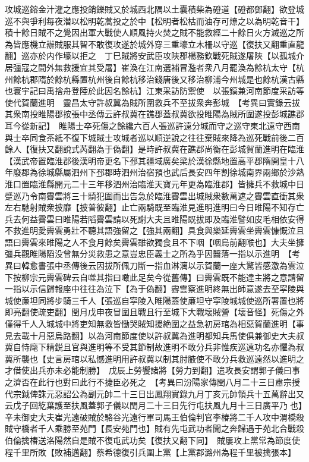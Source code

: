 攻城巡鎔金汁灌之應投銷鑠賊又於城西北隅以土囊積柴為磴道【磴都鄧翻】欲登城巡不與爭利每夜潜以松明乾蒿投之於中【松明者松枯而油存可燎之以為明乾音干】積十餘日賊不之覺因出軍大戰使人順風持火焚之賊不能救經二十餘日火方滅巡之所為皆應機立辦賊服其智不敢復攻遂於城外穿三重壕立木柵以守巡【復扶又翻重直龍翻】巡亦於内作壕以拒之　丁巳賊將安武臣攻陜郡楊務欽戰死賊遂屠陜【以孤城介居彊寇之間外無救援宜其受屠】崔渙在江南選補冒濫者衆八月罷渙為餘杭太守【杭州餘杭郡隋於餘杭縣置杭州後自餘杭移治錢唐後又移治柳浦今州城是也餘杭漢古縣也寰宇記曰禹捨舟登陸於此因名餘杭】江東采訪防禦使　以張鎬兼河南節度采訪等使代賀蘭進明　靈昌太守許叔冀為賊所圍救兵不至拔衆奔彭城　【考異曰實錄云拔其衆南投睢陽郡按張中丞傳云許叔冀在譙郡蓋叔冀欲投睢陽為賊所圍遂投彭城譙郡耳今從新記】　睢陽士卒死傷之餘纔六百人張巡許遠分城而守之巡守東北遠守西南與士卒同食茶紙不復下城賊士攻城者巡以順逆說之往往棄賊來降為巡死戰前後二百餘人【復扶又翻說式芮翻為于偽翻】是時許叔冀在譙郡尚衡在彭城賀蘭進明在臨淮【漢武帝置臨淮郡後漢明帝更名下邳其疆域廣矣梁於漢徐縣地置高平郡隋開皇十八年廢郡為徐城縣屬泗州下邳郡時泗州治宿預也武后長安四年割徐城南界兩鄉於沙熟淮口置臨淮縣開元二十三年移泗州治臨淮天寶元年更為臨淮郡】皆擁兵不救城中日蹙巡乃令南霽雲將三十騎犯圍而出告急於臨淮霽雲出城賊衆數萬遮之霽雲直衝其衆左右馳射賊衆披靡【披普彼翻】止亡兩騎既至臨淮見進明進明曰今日睢陽不知存亡兵去何益霽雲曰睢陽若䧟霽雲請以死謝大夫且睢陽既拔即及臨淮譬如皮毛相依安得不救進明愛霽雲勇壯不聽其語強留之【強其兩翻】具食與樂延霽雲坐霽雲慷慨泣且語曰霽雲來睢陽之人不食月餘矣霽雲雖欲獨食且不下咽【咽烏前翻喉也】大夫坐擁彊兵觀睢陽䧟没曾無分災救患之意豈忠臣義士之所為乎因齧落一指以示進明　【考異曰韓愈書張中丞傳後云因拔所佩刀斷一指血淋漓以示賀蘭一座大驚皆感激為雲泣下按柳宗元霽雲碑云自噬其指曰噉此足矣今從舊傳】曰霽雲既不能達主將之意請留一指以示信歸報座中往往為泣下【為于偽翻】霽雲察進明終無出師意遂去至寜陵與城使亷坦同將步騎三千人【張巡自寜陵入睢陽蓋使亷坦守寜陵城城使巡所署置也將即亮翻使疏吏翻】閏月戊申夜冒圍且戰且行至城下大戰壞賊營【壞音怪】死傷之外僅得千人入城城中將吏知無救皆慟哭賊知援絶圍之益急初房琯為相惡賀蘭進明【事見去載十月惡烏路翻】以為河南節度使以許叔冀為進明都知兵馬使俱兼御史大夫叔冀自恃麾下精鋭且官與進明等不受其節制故進明不敢分兵非惟疾巡遠功名亦懼為叔冀所襲也【史言房琯以私憾進明用許叔冀以制其肘腋使不敢分兵救巡遠然以進明之才借使出兵亦未必能制勝】　戊辰上勞饗諸將【勞力到翻】遣攻長安謂郭子儀曰事之濟否在此行也對曰此行不捷臣必死之　【考異曰汾陽家傳閏八月二十三日肅宗授代宗鉞俾誅元惡詔公為副元帥二十三日出鳳翔實錄九月丁亥元帥領兵十五萬辭出又云戊子回紇葉護至扶風蓋郭子儀以閏月二十三日先行屯扶風九月十三日廣平乃也】辛未御史大夫崔光遠破賊於駱谷光遠行軍司馬王伯倫判官李椿將二千人攻中渭橋殺賊守橋者千人乘勝至苑門【長安苑門也】賊有先屯武功者聞之奔歸遇于苑北合戰殺伯倫擒椿送洛陽然自是賊不復屯武功矣【復扶又翻下同】　賊屢攻上黨常為節度使程千里所敗【敗補邁翻】蔡希德復引兵圍上黨【上黨郡潞州為程千里被擒張本】

